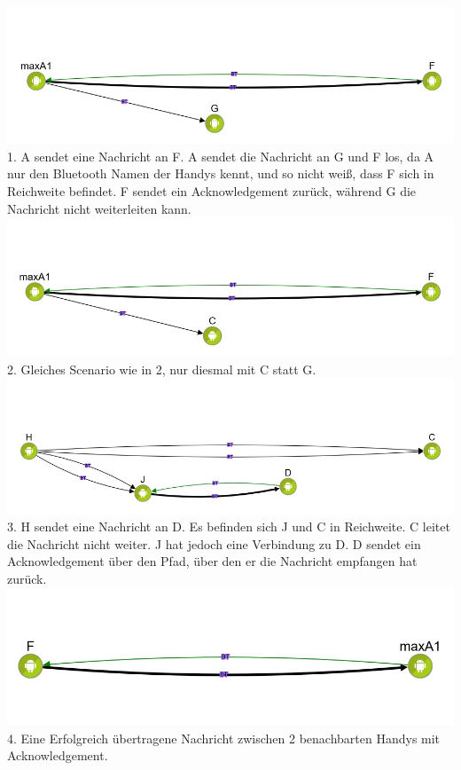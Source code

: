 \includegraphics{belege/grosstests/Bilder/Erfolg4.jpg} 1. A sendet eine
Nachricht an F. A sendet die Nachricht an G und F los, da A nur den
Bluetooth Namen der Handys kennt, und so nicht weiß, dass F sich in
Reichweite befindet. F sendet ein Acknowledgement zurück, während G die
Nachricht nicht weiterleiten kann.
\includegraphics{belege/grosstests/Bilder/Erfolg3.jpg} 2. Gleiches
Scenario wie in 2, nur diesmal mit C statt G.
\includegraphics{belege/grosstests/Bilder/Erfolg2.jpg} 3. H sendet eine
Nachricht an D. Es befinden sich J und C in Reichweite. C leitet die
Nachricht nicht weiter. J hat jedoch eine Verbindung zu D. D sendet ein
Acknowledgement über den Pfad, über den er die Nachricht empfangen hat
zurück. \includegraphics{belege/grosstests/Bilder/Erfolg1.jpg} 4. Eine
Erfolgreich übertragene Nachricht zwischen 2 benachbarten Handys mit
Acknowledgement.

